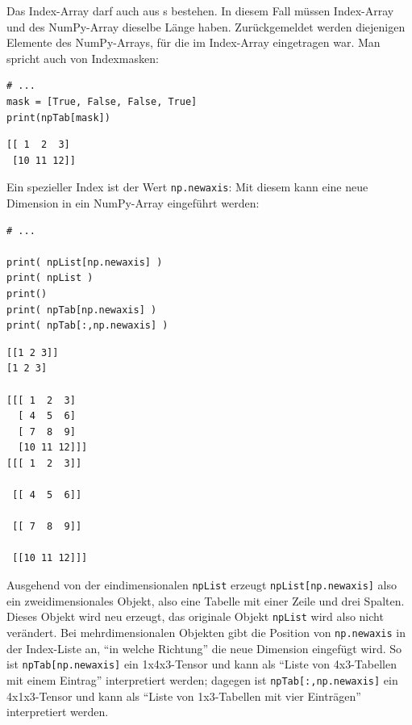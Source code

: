 Das Index-Array darf auch aus s bestehen. In diesem Fall müssen Index-Array und des NumPy-Array dieselbe Länge haben. Zurückgemeldet werden diejenigen Elemente des NumPy-Arrays, für die im Index-Array  eingetragen war. Man spricht auch von Indexmasken:

\begin{tcbraster}[raster columns=2,
                  raster equal height,
                  nobeforeafter,
                  raster column skip=0.5cm]
\begin{codebox}
\begin{verbatim}
# ...
mask = [True, False, False, True]
print(npTab[mask])
\end{verbatim}
\end{codebox}
%
\begin{cmdbox}
\begin{verbatim}
[[ 1  2  3]
 [10 11 12]]
\end{verbatim}
\end{cmdbox}
\end{tcbraster}

Ein spezieller Index ist der Wert \texttt{np.newaxis}: Mit diesem kann eine neue Dimension in ein NumPy-Array eingeführt werden:

\begin{codebox}
\begin{verbatim}
# ...

print( npList[np.newaxis] )
print( npList )
print()
print( npTab[np.newaxis] )
print( npTab[:,np.newaxis] )
\end{verbatim}
\end{codebox}
%
\begin{cmdbox}
\begin{verbatim}
[[1 2 3]]
[1 2 3]

[[[ 1  2  3]
  [ 4  5  6]
  [ 7  8  9]
  [10 11 12]]]
[[[ 1  2  3]]

 [[ 4  5  6]]

 [[ 7  8  9]]

 [[10 11 12]]]
\end{verbatim}
\end{cmdbox}

Ausgehend von der eindimensionalen \texttt{npList} erzeugt \texttt{npList[np.newaxis]} also ein zweidimensionales Objekt, also eine Tabelle mit einer Zeile und drei Spalten. Dieses Objekt wird neu erzeugt, \ie das originale Objekt \texttt{npList} wird also nicht verändert. Bei mehrdimensionalen Objekten gibt die Position von \texttt{np.newaxis} in der Index-Liste an, \enquote{in welche Richtung} die neue Dimension eingefügt wird. So ist \texttt{npTab[np.newaxis]} ein 1x4x3-Tensor und kann als \enquote{Liste von 4x3-Tabellen mit einem Eintrag} interpretiert werden; dagegen ist \texttt{npTab[:,np.newaxis]} ein 4x1x3-Tensor und kann als \enquote{Liste von 1x3-Tabellen mit vier Einträgen} interpretiert werden.

